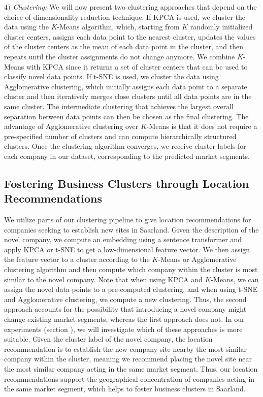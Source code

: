 \documentclass[conference]{IEEEtran}
\begin{document}
\textit{$4)$ Clustering:} We will now present two clustering approaches that depend on the choice of dimensionality reduction technique.
If KPCA is used, we cluster the data using the $K$-Means algorithm, which, starting from $K$ randomly initialized cluster centers, assigns each data point to the nearest cluster, updates the values of the cluster centers as the mean of each data point in the cluster, and then repeats until the cluster assignments do not change anymore. We combine $K$-Means with KPCA since it returns a set of cluster centers that can be used to classify novel data points. 
If t-SNE is used, we cluster the data using Agglomerative clustering, which initially assigns each data point to a separate cluster and then iteratively merges close clusters until all data points are in the same cluster. The intermediate clustering that achieves the largest overall separation between data points can then be chosen as the final clustering. The advantage of Agglomerative clustering over $K$-Means is that it does not require a pre-specified number of clusters and can compute hierarchically structured clusters.
Once the clustering algorithm converges, we receive cluster labels for each company in our dataset, corresponding to the predicted market segments.

\subsection{Fostering Business Clusters through Location Recommendations}
We utilize parts of our clustering pipeline to give location recommendations for companies seeking to establish new sites in Saarland. Given the description of the novel company, we compute an embedding using a sentence transformer and apply KPCA or t-SNE to get a low-dimensional feature vector. We then assign the feature vector to a cluster according to the $K$-Means or Agglomerative clustering algorithm and then compute which company within the cluster is most similar to the novel company. Note that when using KPCA and $K$-Means, we can assign the novel data points to a pre-computed clustering, and when using t-SNE and Agglomerative clustering, we compute a new clustering.
Thus, the second approach accounts for the possibility that introducing a novel company might change existing market segments, whereas the first approach does not. In our experiments (section \MakeUppercase{}), we will investigate which of these approaches is more suitable.
Given the cluster label of the novel company, the location recommendation is to establish the new company site nearby the most similar company within the cluster, meaning we recommend placing the novel site near the most similar company acting in the same market segment. Thus, our location recommendations support the geographical concentration of companies acting in the same market segment, which helps to foster business clusters in Saarland.
\end{document}
